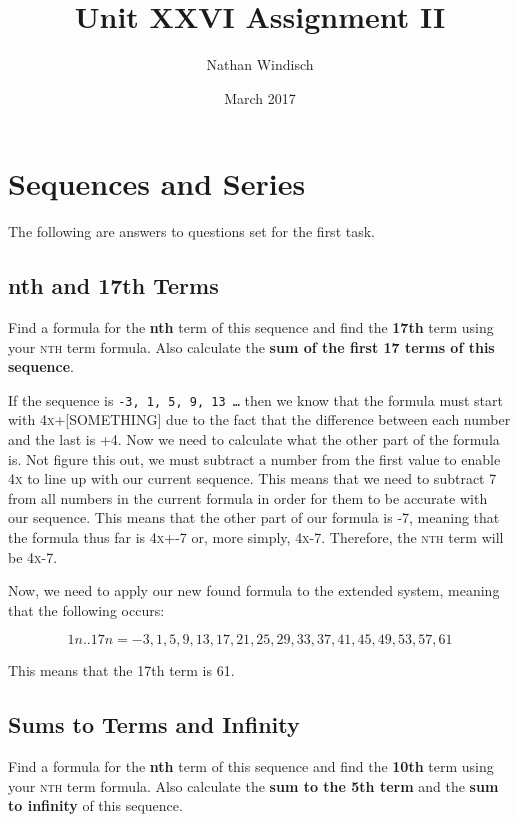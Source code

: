\documentclass[a4paper,12pt]{article}
\begin{document}
\title{Unit XXVI Assignment II}
\author{Nathan Windisch}
\date{March 2017}
\maketitle
{}
\tableofcontents
\newpage

\section{Sequences and Series}
The following are answers to questions set for the first task.
\subsection{nth and 17th Terms}
Find a formula for the \textbf{nth} term of this sequence and find the \textbf{17th} term using your \textsc{nth} term formula. Also calculate the \textbf{sum of the first 17 terms of this sequence}.

If the sequence is \texttt{-3, 1, 5, 9, 13 \ldots} then we know that the formula must start with \textsc{4x+[SOMETHING]} due to the fact that the difference between each number and the last is +4. Now we need to calculate what the other part of the formula is. Not figure this out, we must subtract a number from the first value to enable \textsc{4x} to line up with our current sequence. This means that we need to subtract \textsc{7} from all numbers in the current formula in order for them to be accurate with our sequence. This means that the other part of our formula is \textsc{-7}, meaning that the formula thus far is \textsc{4x+-7} or, more simply, \textsc{4x-7}. Therefore, the \textsc{nth} term will be \textsc{4x-7}.

Now, we need to apply our new found formula to the extended system, meaning that the following occurs:

\[
  {1n..17n = -3, 1, 5, 9, 13, 17, 21, 25, 29, 33, 37, 41, 45, 49, 53, 57, 61}
\]

This means that the 17th term is \textsc{61}.

\newpage

\subsection{Sums to Terms and Infinity}
Find a formula for the \textbf{nth} term of this sequence and find the \textbf{10th} term using your \textsc{nth} term formula. Also calculate the \textbf{sum to the 5th term} and the \textbf{sum to infinity} of this sequence.
\end{document}
